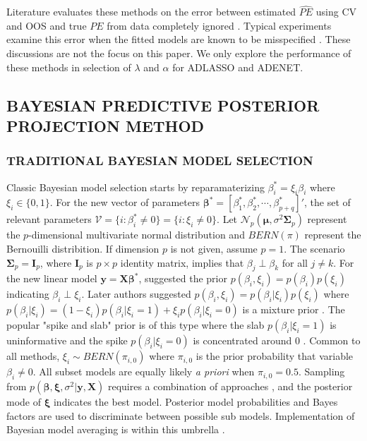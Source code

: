 Literature evaluates these methods on the error between estimated $\widehat{PE}$ using CV and OOS and true $PE$ from data completely ignored \citep{Bergmeir2014,Bergmeir2018}. Typical experiments examine this error when the fitted models are known to be misspecified \citep{Burman1994,Racine2000,Bergmeir2018}. These discussions are not the focus on this paper. We only explore the performance of these methods in selection of $\lambda$ and $\alpha$ for ADLASSO and ADENET. 

\subsection{BAYESIAN PREDICTIVE POSTERIOR PROJECTION METHOD}
\subsubsection{TRADITIONAL BAYESIAN MODEL SELECTION}
Classic Bayesian model selection starts by reparamaterizing $\beta_i^*=\xi_i\beta_i$ where $\xi_i\in\{0,1\}$. For the new vector of parameters $\bm{\beta}^*=[\beta^*_1,\beta^*_2,\cdots,\beta^*_{p+q}]'$, the set of relevant parameters $\mathcal{V}=\{i:\beta^*_i\neq 0\}=\{i:\xi_i\neq 0\}$. Let $\mathcal{N}_p(\bm{\mu},\sigma^2\bm{\Sigma}_p)$ represent the $p$-dimensional multivariate normal distribution and $BERN(\pi)$ represent the Bernouilli distribition. If dimension $p$ is not given, assume $p=1$. The scenario $\bm{\Sigma}_p=\bm{I}_p$, where $\bm{I}_p$ is $p\times p$ identity matrix, implies that $\beta_j\perp\beta_k$ for all $j\neq k$. For the new linear model  $\bm{y}=\bm{X}\bm{\beta}^*$, \cite{Kuo1998} suggested the prior $p(\beta_i,\xi_i)=p(\beta_i)p(\xi_i)$ indicating $\beta_i \perp \xi_i$. Later authors suggested $p(\beta_i,\xi_i)=p(\beta_i|\xi_i)p(\xi_i)$ where $p(\beta_i|\xi_i)=(1-\xi_i)p(\beta_i|\xi_i=1)+\xi_i p(\beta_i|\xi_i=0) $ is a mixture prior \citep{Carlin1995}. The popular "spike and slab" prior is of this type where the slab $p(\beta_i|\xi_i=1)$ is uninformative and the spike $p(\beta_i|\xi_i=0)$ is concentrated around 0 \citep{Mitchell1988,George1993, Carlin1995}. Common to all methods, $\xi_i \sim BERN(\pi_{i,0})$ where $\pi_{i,0}$ is the prior probability that variable $\beta_i \neq 0$. All subset models are equally likely \textit{a priori} when $\pi_{i,0}=0.5$. Sampling from $p(\bm{\beta},\bm{\xi},\sigma^2|\bm{y},\bm{X})$ requires a combination of approaches \citep{Dellaportas2002}, and the posterior mode of $\bm{\xi}$ indicates the best model. Posterior model probabilities and Bayes factors are used to discriminate between possible sub models. Implementation of Bayesian model averaging is within this umbrella \citep{Raftery1997,Hoeting1998,Hoeting1999}.

